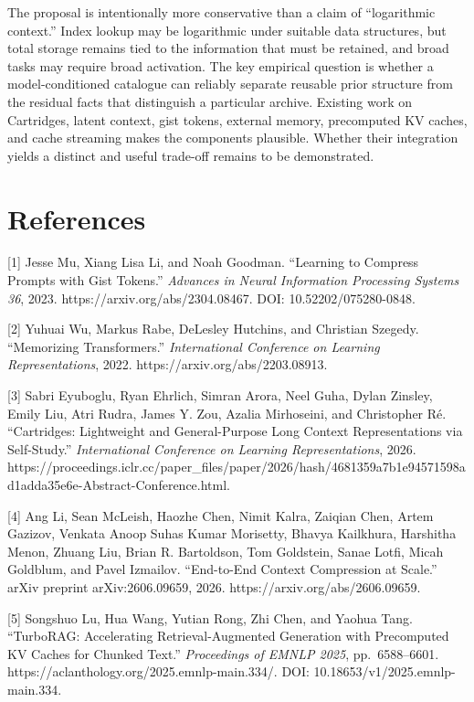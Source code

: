 \documentclass[
  10pt,
]{article}
\begin{document}
The proposal is intentionally more conservative than a claim of
``logarithmic context.'' Index lookup may be logarithmic under suitable
data structures, but total storage remains tied to the information that
must be retained, and broad tasks may require broad activation. The key
empirical question is whether a model-conditioned catalogue can reliably
separate reusable prior structure from the residual facts that
distinguish a particular archive. Existing work on Cartridges, latent
context, gist tokens, external memory, precomputed KV caches, and cache
streaming makes the components plausible. Whether their integration
yields a distinct and useful trade-off remains to be demonstrated.

\section{References}\label{references}

{[}1{]} Jesse Mu, Xiang Lisa Li, and Noah Goodman. ``Learning to
Compress Prompts with Gist Tokens.'' \emph{Advances in Neural
Information Processing Systems 36}, 2023.
https://arxiv.org/abs/2304.08467. DOI: 10.52202/075280-0848.

{[}2{]} Yuhuai Wu, Markus Rabe, DeLesley Hutchins, and Christian
Szegedy. ``Memorizing Transformers.'' \emph{International Conference on
Learning Representations}, 2022. https://arxiv.org/abs/2203.08913.

{[}3{]} Sabri Eyuboglu, Ryan Ehrlich, Simran Arora, Neel Guha, Dylan
Zinsley, Emily Liu, Atri Rudra, James Y. Zou, Azalia Mirhoseini, and
Christopher Ré. ``Cartridges: Lightweight and General-Purpose Long
Context Representations via Self-Study.'' \emph{International Conference
on Learning Representations}, 2026.
https://proceedings.iclr.cc/paper\_files/paper/2026/hash/4681359a7b1e94571598ad1adda35e6e-Abstract-Conference.html.

{[}4{]} Ang Li, Sean McLeish, Haozhe Chen, Nimit Kalra, Zaiqian Chen,
Artem Gazizov, Venkata Anoop Suhas Kumar Morisetty, Bhavya Kailkhura,
Harshitha Menon, Zhuang Liu, Brian R. Bartoldson, Tom Goldstein, Sanae
Lotfi, Micah Goldblum, and Pavel Izmailov. ``End-to-End Context
Compression at Scale.'' arXiv preprint arXiv:2606.09659, 2026.
https://arxiv.org/abs/2606.09659.

{[}5{]} Songshuo Lu, Hua Wang, Yutian Rong, Zhi Chen, and Yaohua Tang.
``TurboRAG: Accelerating Retrieval-Augmented Generation with Precomputed
KV Caches for Chunked Text.'' \emph{Proceedings of EMNLP 2025},
pp.~6588--6601. https://aclanthology.org/2025.emnlp-main.334/. DOI:
10.18653/v1/2025.emnlp-main.334.
\end{document}
